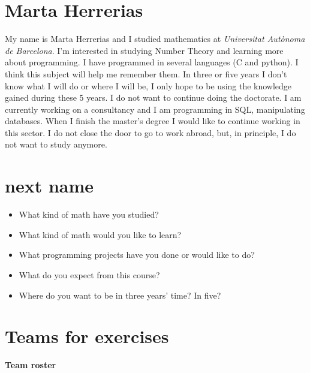 \documentclass[11pt]{amsart}
\begin{document}
\medskip 

\section*{Marta Herrerias}

My name is Marta Herrerias and I studied mathematics at \textit{Universitat Autònoma de Barcelona}. I'm interested in studying Number Theory and
learning more about programming. I have programmed in several languages (C and python).
I think this subject will help me remember them.
In three or five years I don't know what I will do or where I will be, I only hope to be using the knowledge gained during these 5 years.
I do not want to continue doing the doctorate. I am currently working on a consultancy and I am programming in SQL, manipulating databases. When I finish the master's degree I would like to continue working in this sector. 
I do not close the door to go to work abroad, but, in principle, I do not want to study anymore.

\medskip 

\section*{next name}


\begin{itemize}
\item What kind of math have you studied?
\item What kind of math would you like to learn?
\item What programming projects have you done or would like to do?
\item What do you expect from this course?
\item Where do you want to be in three years' time? In five?
\end{itemize}


\medskip

\newpage
\section*{Teams for exercises}

\begin{center}
  \textbf{\sffamily Team roster}
\end{center}
\end{document}
